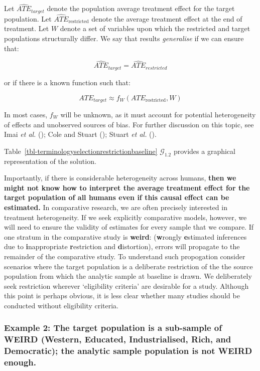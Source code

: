 \documentclass[
  single column]{article}
\begin{document}
Let \(\widehat{ATE}_{target}\) denote the population average treatment
effect for the target population. Let
\(\widehat{ATE}_{\text{restricted}}\) denote the average treatment
effect at the end of treatment. Let \(W\) denote a set of variables upon
which the restricted and target populations structurally differ. We say
that results \emph{generalise} if we can ensure that:

\[
\widehat{ATE}_{target} = \widehat{ATE}_{restricted}
\]

or if there is a known function such that:

\[
ATE_{target} \approx f_W(ATE_{\text{restricted}}, W)
\]

In most cases, \(f_W\) will be unknown, as it must account for potential
heterogeneity of effects and unobserved sources of bias. For further
discussion on this topic, see Imai \emph{et al.}
(); Cole and Stuart
(); Stuart \emph{et al.}
().

Table~\ref{tbl-terminologyselectionrestrictionbaseline}
\(\mathcal{G}_{1.2}\) provides a graphical representation of the
solution.

Importantly, if there is considerable heterogeneity across humans,
\textbf{then we might not know how to interpret the average treatment
effect for the target population of all humans even if this causal
effect can be estimated.} In comparative research, we are often
precisely interested in treatment heterogeneity. If we seek explicitly
comparative models, however, we will need to ensure the validity of
estimates for every sample that we compare. If one stratum in the
comparative study is \textbf{weird}: (\textbf{w}rongly
\textbf{e}stimated inferences due to \textbf{i}nappropriate
\textbf{r}estriction and \textbf{d}istortion), errors will propagate to
the remainder of the comparative study. To understand such propogation
consider scenarios where the target population is a deliberate
restriction of the the source population from which the analytic sample
at baseline is drawn. We deliberately seek restriction wherever
`eligibility criteria' are desirable for a study. Although this point is
perhaps obvious, it is less clear whether many studies should be
conducted without eligibility criteria.

\subsubsection{Example 2: The target population is a sub-sample of WEIRD
(Western, Educated, Industrialised, Rich, and Democratic); the analytic
sample population is not WEIRD
enough.}\label{example-2-the-target-population-is-a-sub-sample-of-weird-western-educated-industrialised-rich-and-democratic-the-analytic-sample-population-is-not-weird-enough.}
\end{document}
